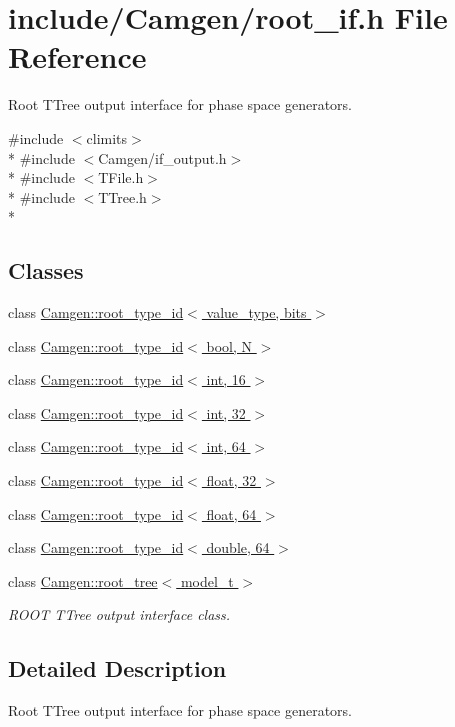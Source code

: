 \hypertarget{a00760}{}\section{include/\+Camgen/root\+\_\+if.h File Reference}
\label{a00760}


Root T\+Tree output interface for phase space generators.  


{\ttfamily \#include $<$climits$>$}\\*
{\ttfamily \#include $<$Camgen/if\+\_\+output.\+h$>$}\\*
{\ttfamily \#include $<$T\+File.\+h$>$}\\*
{\ttfamily \#include $<$T\+Tree.\+h$>$}\\*
\subsection*{Classes}
\begin{DoxyCompactItemize}
\item 
class \hyperlink{a00482}{Camgen\+::root\+\_\+type\+\_\+id$<$ value\+\_\+type, bits $>$}
\item 
class \hyperlink{a00483}{Camgen\+::root\+\_\+type\+\_\+id$<$ bool, N $>$}
\item 
class \hyperlink{a00487}{Camgen\+::root\+\_\+type\+\_\+id$<$ int, 16 $>$}
\item 
class \hyperlink{a00488}{Camgen\+::root\+\_\+type\+\_\+id$<$ int, 32 $>$}
\item 
class \hyperlink{a00489}{Camgen\+::root\+\_\+type\+\_\+id$<$ int, 64 $>$}
\item 
class \hyperlink{a00485}{Camgen\+::root\+\_\+type\+\_\+id$<$ float, 32 $>$}
\item 
class \hyperlink{a00486}{Camgen\+::root\+\_\+type\+\_\+id$<$ float, 64 $>$}
\item 
class \hyperlink{a00484}{Camgen\+::root\+\_\+type\+\_\+id$<$ double, 64 $>$}
\item 
class \hyperlink{a00481}{Camgen\+::root\+\_\+tree$<$ model\+\_\+t $>$}
\begin{DoxyCompactList}\small\item\em R\+O\+O\+T T\+Tree output interface class. \end{DoxyCompactList}\end{DoxyCompactItemize}


\subsection{Detailed Description}
Root T\+Tree output interface for phase space generators. 

